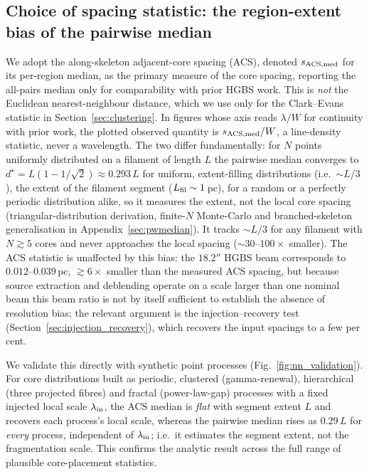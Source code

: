 \documentclass[usenatbib,twoside,twocolumn]{mnras}
\begin{document}
\subsection{Choice of spacing statistic: the region-extent bias of the pairwise median}
\label{sec:statistics}

We adopt the along-skeleton adjacent-core spacing (ACS), denoted $s_{\rm ACS,med}$ for its per-region median, as the primary measure of the core spacing, reporting the all-pairs median only for comparability with prior HGBS work. This is \emph{not} the Euclidean nearest-neighbour distance, which we use only for the Clark--Evans statistic in Section~\ref{sec:clustering}. In figures whose axis reads $\lambda/W$ for continuity with prior work, the plotted observed quantity is $s_{\rm ACS,med}/W$, a line-density statistic, never a wavelength. The two differ fundamentally: for $N$ points uniformly distributed on a filament of length $L$ the pairwise median converges to $d^\star=L(1-1/\sqrt{2})\approx0.293\,L$ for uniform, extent-filling distributions (i.e.\ $\sim L/3$), the extent of the filament segment ($L_{\rm fil}\sim1$\,pc), for a random or a perfectly periodic distribution alike, so it measures the extent, not the local core spacing (triangular-distribution derivation, finite-$N$ Monte-Carlo and branched-skeleton generalisation in Appendix~\ref{sec:pwmedian}). It tracks $\sim L/3$ for any filament with $N\gtrsim5$ cores and never approaches the local spacing ($\sim30$--$100\times$ smaller). The ACS statistic is unaffected by this bias: the $18.2''$ HGBS beam corresponds to $0.012$--$0.039$\,pc, $\gtrsim6\times$ smaller than the measured ACS spacing, but because source extraction and deblending operate on a scale larger than one nominal beam this beam ratio is not by itself sufficient to establish the absence of resolution bias; the relevant argument is the injection--recovery test (Section~\ref{sec:injection_recovery}), which recovers the input spacings to a few per cent.

We validate this directly with synthetic point processes (Fig.~\ref{fig:nn_validation}). For core distributions built as periodic, clustered (gamma-renewal), hierarchical (three projected fibres) and fractal (power-law-gap) processes with a fixed injected local scale $\lambda_{\rm in}$, the ACS median is \emph{flat} with segment extent $L$ and recovers each process's local scale, whereas the pairwise median rises as $0.29\,L$ for \emph{every} process, independent of $\lambda_{\rm in}$; i.e.\ it estimates the segment extent, not the fragmentation scale. This confirms the analytic result across the full range of plausible core-placement statistics.
\end{document}
